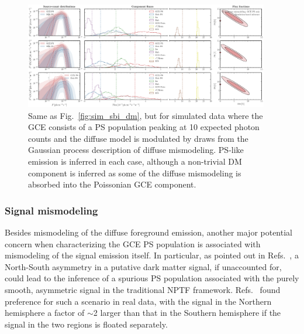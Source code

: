 \documentclass[prd,aps,10pt,nofootinbib,twocolumn,superscriptaddress,preprintnumbers,balancelastpage,longbibliography]{revtex4-1}
\begin{document}
%
\begin{figure}
    \centering
    \includegraphics[width=0.95\textwidth]{plots/sim_sbi_ps_mismo.pdf}
    \caption{Same as Fig.~\ref{fig:sim_sbi_dm}, but for simulated data where the GCE consists of a PS population peaking at 10 expected photon counts and the diffuse model is modulated by draws from the Gaussian process description of diffuse mismodeling. PS-like emission is inferred in each case, although a non-trivial DM component is inferred as some of the diffuse mismodeling is absorbed into the Poissonian GCE component.}
    \label{fig:sim_sbi_ps_mismo}
\end{figure}
%

\subsubsection*{Signal mismodeling}

Besides mismodeling of the diffuse foreground emission, another major potential concern when characterizing the GCE PS population is associated with mismodeling of the signal emission itself. In particular, as pointed out in Refs.~\cite{Leane:2020nmi,Leane:2020pfc}, a North-South asymmetry in a putative dark matter signal, if unaccounted for, could lead to the inference of a spurious PS population associated with the purely smooth, asymmetric signal in the traditional NPTF framework. Refs.~\cite{Leane:2020nmi,Leane:2020pfc} found preference for such a scenario in real \Fermi data, with the signal in the Northern hemisphere a factor of $\sim$2 larger than that in the Southern hemisphere if the signal in the two regions is floated separately. 
\end{document}
